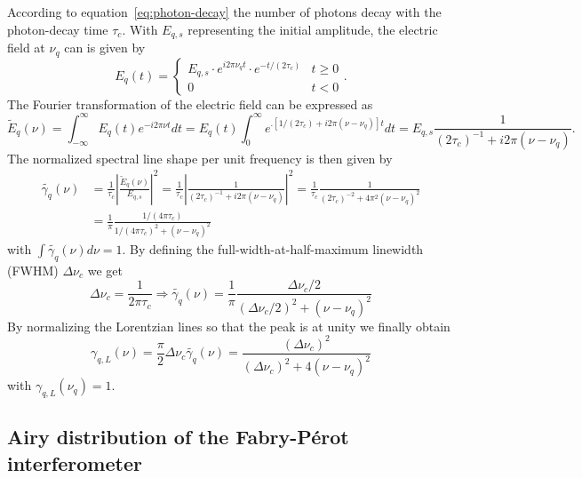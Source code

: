 According to equation~\eqref{eq:photon-decay} the number of photons decay with the photon-decay time $\tau_c$. With $E_{q,s}$ representing the initial amplitude, the electric field at $\nu_q$ can is given by
\begin{equation}
E_q(t) = 
\begin{cases}
E_{q,s} \cdot e^{i2\pi\nu_qt} \cdot e^{-t/(2\tau_c)} &  t \geq 0 \\
0 &  t < 0
\end{cases}
.
\end{equation}
The Fourier transformation of the electric field can be expressed as
\begin{equation}
\tilde{E}_q(\nu) = \int_{-\infty}^\infty E_q(t)e^{-i2\pi\nu t}dt = E_q(t) \int_{0}^\infty e^{.[1/(2\tau_c)+i2\pi(\nu-\nu_q)]t}dt = E_{q,s} \frac{1}{(2\tau_c)^{-1}+i2\pi(\nu-\nu_q)}.
\end{equation}
The normalized spectral line shape per unit frequency is then given by
\begin{align}
\label{eq:round-trip-phase-shift}
\tilde{\gamma_q}(\nu)&=\frac{1}{\tau_c}\left|\frac{\tilde{E}_q(\nu)}{E_{q,s}}\right|^2=\frac{1}{\tau_c}\left|\frac{1}{(2\tau_c)^{-1}+i2\pi(\nu-\nu_q)}\right|^2 = \frac{1}{\tau_c}\frac{1}{(2\tau_c)^{-2}+4\pi^2(\nu-\nu_q)^2} \\
&=\frac{1}{\pi}\frac{1/(4\pi\tau_c)}{1/(4\pi\tau_c)^2+(\nu-\nu_q)^2}
\end{align}
with $\int \tilde{\gamma_q}(\nu)d\nu=1$.
By defining the full-width-at-half-maximum linewidth (FWHM) $\Delta\nu_c$ we get
\begin{equation}
\Delta \nu_c = \frac{1}{2\pi\tau_c} \Rightarrow \tilde{\gamma_q}(\nu) = \frac{1}{\pi}\frac{\Delta \nu_c/2}{\left(\Delta\nu_c/2\right)^2+\left(\nu-\nu_q\right)^2}
\end{equation}
By normalizing the Lorentzian lines so that the peak is at unity we finally obtain
\begin{equation}
\label{eq:lorentzian}
\gamma_{q,L}(\nu)=\frac{\pi}{2}\Delta\nu_c\tilde{\gamma_q}(\nu)=\frac{(\Delta\nu_c)^2}{\left(\Delta \nu_c\right)^2+4\left(\nu-\nu_q\right)^2}
\end{equation}
with $\gamma_{q,L}(\nu_q)=1$.
\subsection{Airy distribution of the Fabry-Pérot interferometer}

